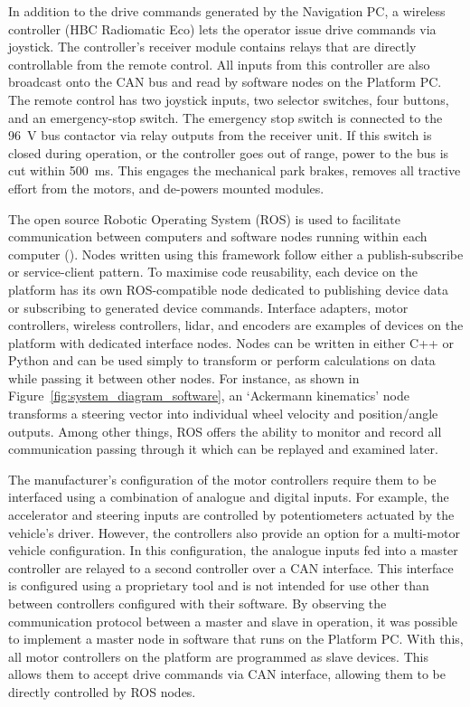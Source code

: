 \documentclass[preprint,authoryear,12pt]{elsarticle}
\begin{document}
        In addition to the drive commands generated by the Navigation PC, a wireless controller (HBC Radiomatic Eco) lets the operator issue drive commands via joystick.
        The controller's receiver module contains relays that are directly controllable from the remote control.
        All inputs from this controller are also broadcast onto the CAN bus and read by software nodes on the Platform PC.
        The remote control has two joystick inputs, two selector switches, four buttons, and an emergency-stop switch.
        The emergency stop switch is connected to the \SI{96}{\volt} bus contactor via relay outputs from the receiver unit.
        If this switch is closed during operation, or the controller goes out of range, power to the bus is cut within \SI{500}{\milli\second}.
        This engages the mechanical park brakes, removes all tractive effort from the motors, and de-powers mounted modules.

        The open source Robotic Operating System (ROS) is used to facilitate communication between computers and software nodes running within each computer (\cite{quigley2009}).
        Nodes written using this framework follow either a publish-subscribe or service-client pattern.
        To maximise code reusability, each device on the platform has its own ROS-compatible node dedicated to publishing device data or subscribing to generated device commands.
        Interface adapters, motor controllers, wireless controllers, lidar, and encoders are examples of devices on the platform with dedicated interface nodes.
        Nodes can be written in either C++ or Python and can be used simply to transform or perform calculations on data while passing it between other nodes.
        For instance, as shown in Figure~\ref{fig:system_diagram_software}, an `Ackermann kinematics' node transforms a steering vector into individual wheel velocity and position/angle outputs.
        Among other things, ROS offers the ability to monitor and record all communication passing through it which can be replayed and examined later.

        The manufacturer's configuration of the motor controllers require them to be interfaced using a combination of analogue and digital inputs.
        For example, the accelerator and steering inputs are controlled by potentiometers actuated by the vehicle's driver.
        However, the controllers also provide an option for a multi-motor vehicle configuration.
        In this configuration, the analogue inputs fed into a master controller are relayed to a second controller over a CAN interface.
        This interface is configured using a proprietary tool and is not intended for use other than between controllers configured with their software.
        By observing the communication protocol between a master and slave in operation, it was possible to implement a master node in software that runs on the Platform PC.
        With this, all motor controllers on the platform are programmed as slave devices.
        This allows them to accept drive commands via CAN interface, allowing them to be directly controlled by ROS nodes.
\end{document}

